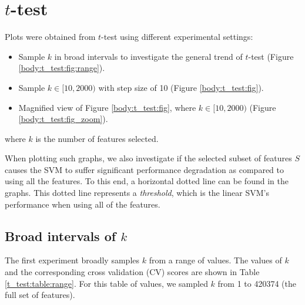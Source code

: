 \documentclass[12pt, twoside, a4paper]{report}
\begin{document}
\section{$t$-test}
Plots were obtained from $t$-test using different experimental settings:
\begin{itemize}
  \item Sample $k$ in broad intervals to investigate the general trend of $t$-test (Figure \ref{body:t_test:fig:range}).
  \item Sample $k\in [10,2000)$ with step size of 10 (Figure \ref{body:t_test:fig}).
  \item Magnified view of Figure \ref{body:t_test:fig}, where $k \in [10,2000)$ (Figure \ref{body:t_test:fig_zoom}).
\end{itemize}
where $k$ is the number of features selected.

When plotting such graphs, we also investigate if the selected subset of features $S$ causes the SVM to suffer significant performance degradation as compared to using all the features. To this end, a horizontal dotted line can be found in the graphs. This dotted line represents a \textit{threshold}, which is the linear SVM's performance when using all of the features.

\subsection{Broad intervals of $k$}
The first experiment broadly samples $k$ from a range of values. The values of $k$ and the corresponding cross validation (CV) scores are shown in Table \ref{t_test:table:range}. For this table of values, we sampled $k$ from 1 to 420374 (the full set of features). 
\end{document}
